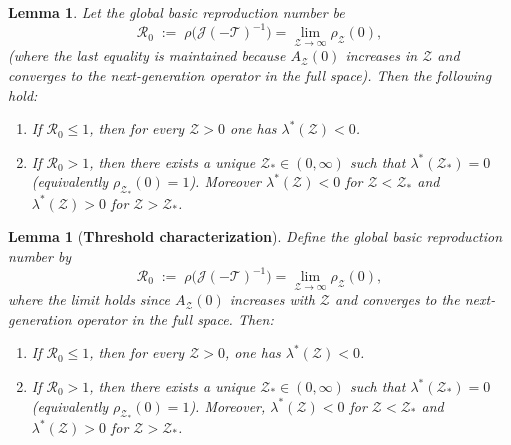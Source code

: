 \documentclass[a4paper,11pt]{amsart}
\newtheorem{lemma}[theorem]{Lemma}
\theoremstyle{definition}
\numberwithin{equation}{section}
\theoremstyle{definition}
\begin{document}
\begin{lemma}
Let the global basic reproduction number be
\[
\mathcal R_0 \;:=\; \rho\!\big(\mathscr J(-\mathscr T)^{-1}\big)
= \lim_{\mathcal Z \to\infty}\rho_{\mathcal Z}(0),
\]
(where the last equality is maintained because $A_{\mathcal Z}(0)$ increases in $\mathcal Z$ and converges to the next-generation operator in the full space).
Then the following hold:
\begin{enumerate}
  \item If $\mathcal R_0\leq 1$, then for every $\mathcal Z>0$ one has $\lambda^\ast(\mathcal Z)<0$.
  \item If $\mathcal R_0>1$, then there exists a unique $\mathcal Z_\ast\in(0,\infty)$ such that $\lambda^\ast(\mathcal Z_\ast)=0$ (equivalently $\rho_{\mathcal Z_\ast}(0)=1$). Moreover $\lambda^\ast(\mathcal Z)<0$ for $\mathcal Z<\mathcal Z_\ast$ and $\lambda^\ast(\mathcal Z)>0$ for $\mathcal Z>\mathcal Z_\ast$.
\end{enumerate}
\end{lemma}
\begin{lemma}[\textbf{Threshold characterization}]\label{ThresholdCaracterestique}
Define the global basic reproduction number by
\[
\mathcal R_0 \;:=\; \rho\!\big(\mathscr J(-\mathscr T)^{-1}\big)
= \lim_{\mathcal Z \to\infty}\rho_{\mathcal Z}(0),
\]
where the limit holds since $A_{\mathcal Z}(0)$ increases with $\mathcal Z$ and converges to the next-generation operator in the full space. Then:
\begin{enumerate}
  \item If $\mathcal R_0\leq 1$, then for every $\mathcal Z>0$, one has $\lambda^\ast(\mathcal Z)<0$.
  \item If $\mathcal R_0>1$, then there exists a unique $\mathcal Z_\ast\in(0,\infty)$ such that $\lambda^\ast(\mathcal Z_\ast)=0$ (equivalently $\rho_{\mathcal Z_\ast}(0)=1$). Moreover, $\lambda^\ast(\mathcal Z)<0$ for $\mathcal Z<\mathcal Z_\ast$ and $\lambda^\ast(\mathcal Z)>0$ for $\mathcal Z>\mathcal Z_\ast$.
\end{enumerate}
\end{lemma}
\end{document}
